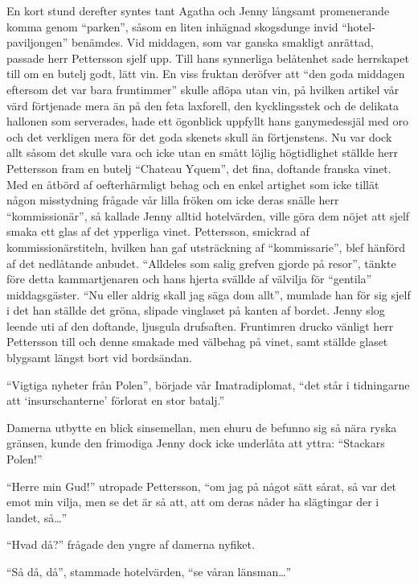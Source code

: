 En kort stund derefter syntes tant Agatha och Jenny långsamt
promenerande komma genom ``parken'', såsom en liten inhägnad skogsdunge
invid ``hotel-paviljongen'' benämdes. Vid middagen, som var ganska
smakligt anrättad, passade herr Pettersson sjelf upp. Till hans
synnerliga belåtenhet sade herrskapet till om en butelj godt, lätt vin.
En viss fruktan deröfver att ``den goda middagen eftersom det var bara
fruntimmer'' skulle aflöpa utan vin, på hvilken artikel vår värd
förtjenade mera än på den feta laxforell, den kycklingsstek och de
delikata hallonen som serverades, hade ett ögonblick uppfyllt hans
ganymedessjäl med oro och det verkligen mera för det goda skenets skull
än förtjenstens. Nu var dock allt såsom det skulle vara och icke utan en
smått löjlig högtidlighet ställde herr Pettersson fram en butelj
``Chateau Yquem'', det fina, doftande franska vinet. Med en åtbörd af
oefterhärmligt behag och en enkel artighet som icke tillät någon
misstydning frågade vår lilla fröken om icke deras snälle herr
``kommissionär'', så kallade Jenny alltid hotelvärden, ville göra dem
nöjet att sjelf smaka ett glas af det ypperliga vinet. Pettersson,
smickrad af kommissionärstiteln, hvilken han gaf utsträckning af
``kommissarie'', blef hänförd af det nedlåtande anbudet. ``Alldeles som
salig grefven gjorde på resor'', tänkte före detta kammartjenaren och
hans hjerta svällde af välvilja för ``gentila'' middagsgäster. ``Nu
eller aldrig skall jag säga dom allt'', mumlade han för sig sjelf i det
han ställde det gröna, slipade vinglaset på kanten af bordet. Jenny slog
leende uti af den doftande, ljusgula drufsaften. Fruntimren drucko
vänligt herr Pettersson till och denne smakade med välbehag på vinet,
samt ställde glaset blygsamt längst bort vid bordsändan.

``Vigtiga nyheter från Polen'', började vår Imatradiplomat, ``det står i
tidningarne att `insurschanterne' förlorat en stor batalj.''

Damerna utbytte en blick sinsemellan, men ehuru de befunno sig så nära
ryska gränsen, kunde den frimodiga Jenny dock icke underlåta att yttra:
``Stackars Polen!''

``Herre min Gud!'' utropade Pettersson, ``om jag på något sätt sårat, så
var det emot min vilja, men se det är så att, att om deras nåder ha
slägtingar der i landet, så\ldots{}''

``Hvad då?'' frågade den yngre af damerna nyfiket.

``Så då, då'', stammade hotelvärden, ``se våran länsman\ldots{}''


